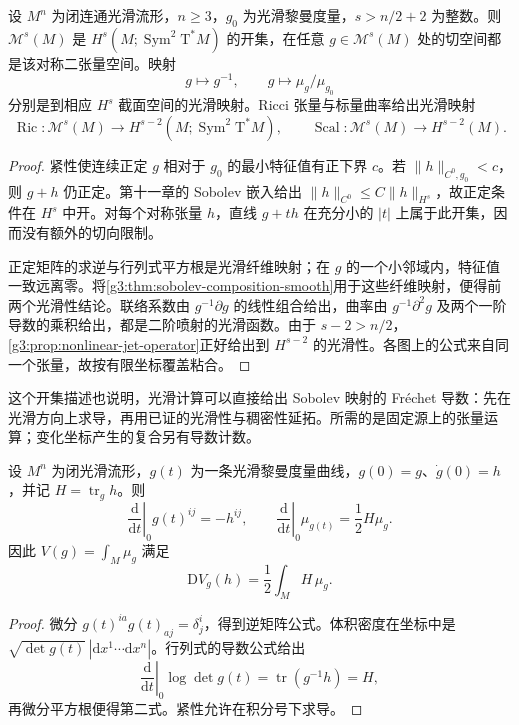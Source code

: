 \begin{proposition}\label{g3:prop:metric-sobolev-open}
	设 \(M^n\) 为闭连通光滑流形，\(n\ge3\)，\(g_0\) 为光滑黎曼度量，\(s>n/2+2\) 为整数。则 \(\mathcal M^s(M)\) 是 \(H^s(M;\operatorname{Sym}^2\mathrm T^*M)\) 的开集，在任意 \(g\in\mathcal M^s(M)\) 处的切空间都是该对称二张量空间。映射
	\[
		g\longmapsto g^{-1},\qquad g\longmapsto\mu_g/\mu_{g_0}
	\]
	分别是到相应 \(H^s\) 截面空间的光滑映射。Ricci 张量与标量曲率给出光滑映射
	\[
		\operatorname{Ric}:\mathcal M^s(M)\longrightarrow H^{s-2}(M;\operatorname{Sym}^2\mathrm T^*M),
		\qquad
		\operatorname{Scal}:\mathcal M^s(M)\longrightarrow H^{s-2}(M).
	\]
\end{proposition}
\begin{proof}
	紧性使连续正定 \(g\) 相对于 \(g_0\) 的最小特征值有正下界 \(c\)。若 \(\|h\|_{C^0,g_0}<c\)，则 \(g+h\) 仍正定。第十一章的 Sobolev 嵌入给出 \(\|h\|_{C^0}\le C\|h\|_{H^s}\)，故正定条件在 \(H^s\) 中开。对每个对称张量 \(h\)，直线 \(g+th\) 在充分小的 \(|t|\) 上属于此开集，因而没有额外的切向限制。

	正定矩阵的求逆与行列式平方根是光滑纤维映射；在 \(g\) 的一个小邻域内，特征值一致远离零。将\cref{g3:thm:sobolev-composition-smooth}用于这些纤维映射，便得前两个光滑性结论。联络系数由 \(g^{-1}\partial g\) 的线性组合给出，曲率由 \(g^{-1}\partial^2g\) 及两个一阶导数的乘积给出，都是二阶喷射的光滑函数。由于 \(s-2>n/2\)，\cref{g3:prop:nonlinear-jet-operator}正好给出到 \(H^{s-2}\) 的光滑性。各图上的公式来自同一个张量，故按有限坐标覆盖粘合。
\end{proof}

这个开集描述也说明，光滑计算可以直接给出 Sobolev 映射的 Fréchet 导数：先在光滑方向上求导，再用已证的光滑性与稠密性延拓。所需的是固定源上的张量运算；变化坐标产生的复合另有导数计数。

\begin{lemma}\label{g3:lem:metric-inverse-volume-variation}
	设 \(M^n\) 为闭光滑流形，\(g(t)\) 为一条光滑黎曼度量曲线，\(g(0)=g\)、\(\dot g(0)=h\)，并记 \(H=\operatorname{tr}_g h\)。则
	\begin{equation}\label{g3:eq:inverse-volume-variation}
		\left.\frac{\mathrm d}{\mathrm dt}\right|_0g(t)^{ij}=-h^{ij},
		\qquad
		\left.\frac{\mathrm d}{\mathrm dt}\right|_0\mu_{g(t)}=\frac12H\mu_g.
	\end{equation}
	因此 \(V(g)=\int_M\mu_g\) 满足
	\[
		\mathrm DV_g(h)=\frac12\int_MH\,\mu_g.
	\]
\end{lemma}
\begin{proof}
	微分 \(g(t)^{ia}g(t)_{aj}=\delta^i_j\)，得到逆矩阵公式。体积密度在坐标中是 \(\sqrt{\det g(t)}\,|\mathrm dx^1\cdots\mathrm dx^n|\)。行列式的导数公式给出
	\[
		\left.\frac{\mathrm d}{\mathrm dt}\right|_0\log\det g(t)=\operatorname{tr}(g^{-1}h)=H,
	\]
	再微分平方根便得第二式。紧性允许在积分号下求导。
\end{proof}

